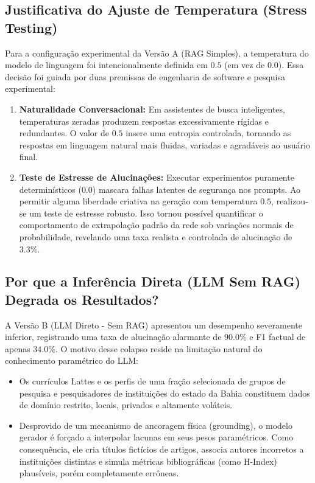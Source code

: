 \documentclass[12pt,a4paper]{article}
\begin{document}
\subsection{Justificativa do Ajuste de Temperatura (Stress Testing)}
Para a configuração experimental da Versão A (RAG Simples), a temperatura do modelo de linguagem foi intencionalmente definida em $0.5$ (em vez de $0.0$). Essa decisão foi guiada por duas premissas de engenharia de software e pesquisa experimental:
\begin{enumerate}
    \item \textbf{Naturalidade Conversacional:} Em assistentes de busca inteligentes, temperaturas zeradas produzem respostas excessivamente rígidas e redundantes. O valor de $0.5$ insere uma entropia controlada, tornando as respostas em linguagem natural mais fluidas, variadas e agradáveis ao usuário final.
    \item \textbf{Teste de Estresse de Alucinações:} Executar experimentos puramente determinísticos ($0.0$) mascara falhas latentes de segurança nos prompts. Ao permitir alguma liberdade criativa na geração com temperatura $0.5$, realizou-se um teste de estresse robusto. Isso tornou possível quantificar o comportamento de extrapolação padrão da rede sob variações normais de probabilidade, revelando uma taxa realista e controlada de alucinação de $3.3\%$.
\end{enumerate}

\subsection{Por que a Inferência Direta (LLM Sem RAG) Degrada os Resultados?}
A Versão B (LLM Direto - Sem RAG) apresentou um desempenho severamente inferior, registrando uma taxa de alucinação alarmante de $90.0\%$ e F1 factual de apenas $34.0\%$. O motivo desse colapso reside na limitação natural do conhecimento paramétrico do LLM:
\begin{itemize}
    \item Os currículos Lattes e os perfis de uma fração selecionada de grupos de pesquisa e pesquisadores de instituições do estado da Bahia constituem dados de domínio restrito, locais, privados e altamente voláteis. 
    \item Desprovido de um mecanismo de ancoragem física (grounding), o modelo gerador é forçado a interpolar lacunas em seus pesos paramétricos. Como consequência, ele cria títulos fictícios de artigos, associa autores incorretos a instituições distintas e simula métricas bibliográficas (como H-Index) plausíveis, porém completamente errôneas.
\end{itemize}
\end{document}
